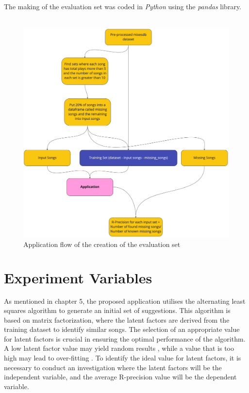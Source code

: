 The making of the evaluation set was coded in \textit{Python} using the \textit{pandas} library.
\\
\\
\begin{figure}[H]
	\includegraphics[scale=0.1]{images/evaluation_set_app_flow}
	\centering
	\caption{Application flow of the creation of the evaluation set} 
\end{figure}

\section{Experiment Variables}

As mentioned in chapter 5, the proposed application utilises the alternating least squares algorithm to generate an initial set of suggestions. This algorithm is based on matrix factorization, where the latent factors are derived from the training dataset to identify similar songs. The selection of an appropriate value for latent factors is crucial in ensuring the optimal performance of the algorithm. A low latent factor value may yield random results , while a value that is too high may lead to over-fitting \citep{zhou_large-scale_2008}. To identify the ideal value for latent factors, it is necessary to conduct an  investigation where the latent factors will be the independent variable, and the average R-precision value will be the dependent variable. 

